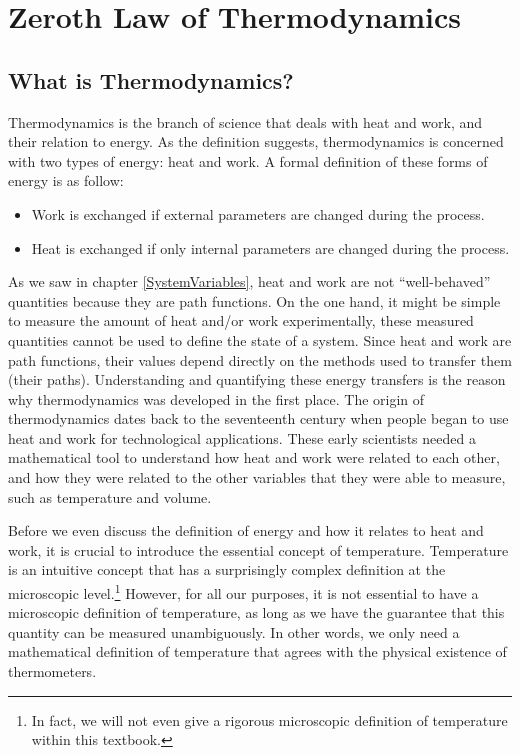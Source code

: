 \documentclass[
  9pt,
]{extbook}
\providecommand{\tightlist}{%
  \setlength{\itemsep}{0pt}\setlength{\parskip}{0pt}}
\theoremstyle{definition}
\theoremstyle{definition}
\theoremstyle{definition}
\theoremstyle{remark}
\begin{document}
\hypertarget{ZerothLaw}{%
\chapter{Zeroth Law of Thermodynamics}\label{ZerothLaw}}

\hypertarget{what-is-thermodynamics}{%
\section{What is Thermodynamics?}\label{what-is-thermodynamics}}

Thermodynamics is the branch of science that deals with heat and work, and their relation to energy. As the definition suggests, thermodynamics is concerned with two types of energy: heat and work. A formal definition of these forms of energy is as follow:

\begin{itemize}
\tightlist
\item
  Work is exchanged if external parameters are changed during the process.
\item
  Heat is exchanged if only internal parameters are changed during the process.
\end{itemize}

As we saw in chapter \ref{SystemVariables}, heat and work are not ``well-behaved'' quantities because they are path functions. On the one hand, it might be simple to measure the amount of heat and/or work experimentally, these measured quantities cannot be used to define the state of a system. Since heat and work are path functions, their values depend directly on the methods used to transfer them (their paths). Understanding and quantifying these energy transfers is the reason why thermodynamics was developed in the first place. The origin of thermodynamics dates back to the seventeenth century when people began to use heat and work for technological applications. These early scientists needed a mathematical tool to understand how heat and work were related to each other, and how they were related to the other variables that they were able to measure, such as temperature and volume.

Before we even discuss the definition of energy and how it relates to heat and work, it is crucial to introduce the essential concept of temperature. Temperature is an intuitive concept that has a surprisingly complex definition at the microscopic level.\footnote{In fact, we will not even give a rigorous microscopic definition of temperature within this textbook.} However, for all our purposes, it is not essential to have a microscopic definition of temperature, as long as we have the guarantee that this quantity can be measured unambiguously. In other words, we only need a mathematical definition of temperature that agrees with the physical existence of thermometers.
\end{document}
